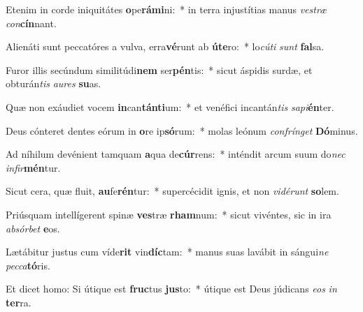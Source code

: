 \item Etenim in corde iniquitátes \textbf{o}pe\textbf{rá}\textbf{mi}ni:~* in terra injustítias manus \textit{ves}\textit{træ} \textit{con}\textbf{cín}nant.
\item Alienáti sunt peccatóres a vulva, erra\textbf{vé}runt ab \textbf{ú}\textbf{te}ro:~* lo\textit{cú}\textit{ti} \textit{sunt} \textbf{fal}sa.
\item Furor illis secúndum similitúdi\textbf{nem} ser\textbf{pén}tis:~* sicut áspidis surdæ, et obturán\textit{tis} \textit{au}\textit{res} \textbf{su}as.
\item Quæ non exáudiet vocem \textbf{in}can\textbf{tán}\textbf{ti}um:~* et venéfici incantán\textit{tis} \textit{sa}\textit{pi}\textbf{én}ter.
\item Deus cónteret dentes eórum in \textbf{o}re ip\textbf{só}rum:~* molas leónum \textit{con}\textit{frín}\textit{get} \textbf{Dó}minus.
\item Ad níhilum devénient tamquam \textbf{a}qua de\textbf{cúr}rens:~* inténdit arcum suum do\textit{nec} \textit{in}\textit{fir}\textbf{mén}tur.
\item Sicut cera, quæ fluit, \textbf{au}fe\textbf{rén}tur:~* supercécidit ignis, et non \textit{vi}\textit{dé}\textit{runt} \textbf{so}lem.
\item Priúsquam intellígerent spinæ \textbf{ves}træ \textbf{rham}num:~* sicut vivéntes, sic in ira \textit{ab}\textit{sór}\textit{bet} \textbf{e}os.
\item Lætábitur justus cum víde\textbf{rit} vin\textbf{díc}tam:~* manus suas lavábit in sángui\textit{ne} \textit{pec}\textit{ca}\textbf{tó}ris.
\item Et dicet homo: Si útique est \textbf{fruc}tus \textbf{jus}to:~* útique est Deus júdicans \textit{e}\textit{os} \textit{in} \textbf{ter}ra.
